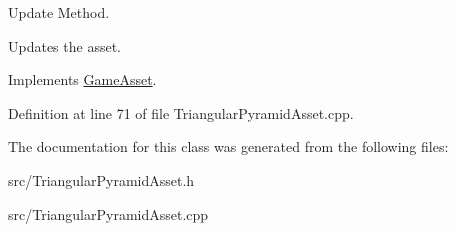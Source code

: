 Update Method. 

Updates the asset. 

Implements \hyperlink{classGameAsset}{Game\-Asset}.



Definition at line 71 of file Triangular\-Pyramid\-Asset.\-cpp.



The documentation for this class was generated from the following files\-:\begin{DoxyCompactItemize}
\item 
src/Triangular\-Pyramid\-Asset.\-h\item 
src/Triangular\-Pyramid\-Asset.\-cpp\end{DoxyCompactItemize}
